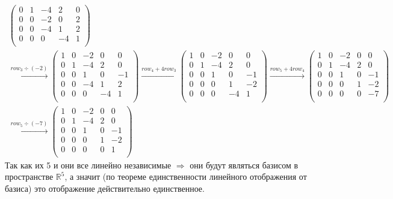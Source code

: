 \documentclass[a4paper,11pt]{article}
\begin{document}
\begin{gather*}
\begin{pmatrix}
0 & 1 & -4 & 2 & 0 \\
0 & 0 & -2 & 0 & 2 \\
0 & 0 & -4 & 1 & 2 \\
0 & 0 & 0 & -4 & 1 \\
\end{pmatrix}
\\[3pt]
\stackrel{ row_{3} \div (-2) }{\longrightarrow}
\begin{pmatrix}
1 & 0 & -2 & 0 & 0 \\
0 & 1 & -4 & 2 & 0 \\
0 & 0 & 1 & 0 & -1 \\
0 & 0 & -4 & 1 & 2 \\
0 & 0 & 0 & -4 & 1 \\
\end{pmatrix}
\stackrel{ row_{4} + 4row_{3} }{\longrightarrow}
\begin{pmatrix}
1 & 0 & -2 & 0 & 0 \\
0 & 1 & -4 & 2 & 0 \\
0 & 0 & 1 & 0 & -1 \\
0 & 0 & 0 & 1 & -2 \\
0 & 0 & 0 & -4 & 1 \\
\end{pmatrix}
\stackrel{ row_{5} + 4row_{4} }{\longrightarrow}
\begin{pmatrix}
1 & 0 & -2 & 0 & 0 \\
0 & 1 & -4 & 2 & 0 \\
0 & 0 & 1 & 0 & -1 \\
0 & 0 & 0 & 1 & -2 \\
0 & 0 & 0 & 0 & -7 \\
\end{pmatrix}
\\[3pt]
\stackrel{ row_{5} \div (-7) }{\longrightarrow}
\begin{pmatrix}
1 & 0 & -2 & 0 & 0 \\
0 & 1 & -4 & 2 & 0 \\
0 & 0 & 1 & 0 & -1 \\
0 & 0 & 0 & 1 & -2 \\
0 & 0 & 0 & 0 & 1 \\
\end{pmatrix}	
\end{gather*}
Так как их 5 и они все линейно независимые $ \Rightarrow $ они будут являться базисом в пространстве $ \mathbb{R}^5 $, а значит (по теореме единственности линейного отображения от базиса) это отображение действительно  единственное.
\\[3pt] 
\end{document}

